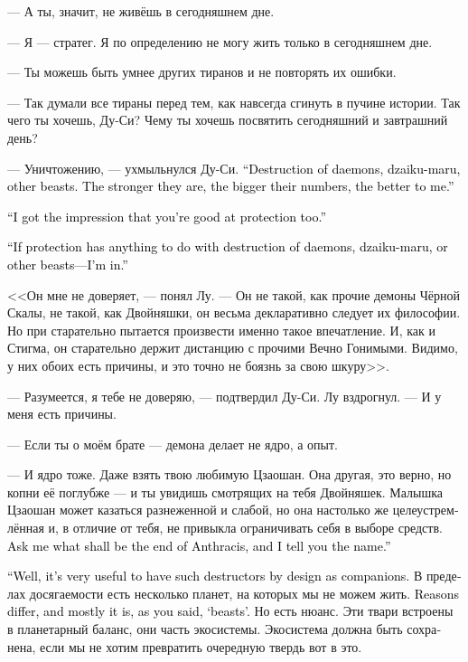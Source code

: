 \documentclass[a4paper,12pt,fleqn]{book}\usepackage{cooltooltips}\usepackage{polyglossia}\setdefaultlanguage[babelshorthands=true]{russian}\setotherlanguage{english}\defaultfontfeatures{Ligatures=TeX,Mapping=tex-text} \usepackage{xcolor}\definecolor{lightgray}{HTML}{bbbbbb}\color{lightgray}\newcommand{\ml}[3]{\textenglish{\textcolor{black}{#3}}}
\begin{document}
{--- А ты, значит, не живёшь в сегодняшнем дне.

--- Я --- стратег.
Я по определению не могу жить только в сегодняшнем дне.

--- Ты можешь быть умнее других тиранов и не повторять их ошибки.

--- Так думали все тираны перед тем, как навсегда сгинуть в пучине истории.
Так чего ты хочешь, Ду-Си?
Чему ты хочешь посвятить сегодняшний и завтрашний день?

--- Уничтожению, --- ухмыльнулся Ду-Си.
\ml{$0$}
{--- Уничтожать демонов, дзайку-мару, иных тварей.}
{``Destruction of daemons, dzaiku-maru, other beasts.}
\ml{$0$}
{Чем сильнее и многочисленнее твари --- тем лучше.}
{The stronger they are, the bigger their numbers, the better to me.''}

\ml{$0$}
{--- У меня создалось впечатление, что ты не против и защищать.}
{``I got the impression that you're good at protection too.''}

\ml{$0$}
{--- Если защита связана с уничтожением демонов, дзайку-мару и иных тварей --- я не против.}
{``If protection has anything to do with destruction of daemons, dzaiku-maru, or other beasts---I'm in.''}

<<Он мне не доверяет, --- понял Лу.
--- Он не такой, как прочие демоны Чёрной Скалы, не такой, как Двойняшки, он весьма декларативно следует их философии.
Но при старательно пытается произвести именно такое впечатление.
И, как и Стигма, он старательно держит дистанцию с прочими Вечно Гонимыми.
Видимо, у них обоих есть причины, и это точно не боязнь за свою шкуру>>.

--- Разумеется, я тебе не доверяю, --- подтвердил Ду-Си.
Лу вздрогнул.
--- И у меня есть причины.

--- Если ты о моём брате --- демона делает не ядро, а опыт.

--- И ядро тоже.
Даже взять твою любимую Цзаошан.
Она другая, это верно, но копни её поглубже --- и ты увидишь смотрящих на тебя Двойняшек.
Малышка Цзаошан может казаться разнеженной и слабой, но она настолько же целеустремлённая и, в отличие от тебя, не привыкла ограничивать себя в выборе средств.
\ml{$0$}
{Спроси, что положит конец клану Антрацис --- и я назову тебе имя.}
{Ask me what shall be the end of Anthracis, and I tell you the name.''}

\ml{$0$}
{--- Что ж, очень кстати, что у меня есть соратники, спроектированные для уничтожения.}
{``Well, it's very useful to have such destructors by design as companions.}
В пределах досягаемости есть несколько планет, на которых мы не можем жить.
\ml{$0$}
{Причины разные, чаще всего это, как ты выразился, <<твари>>.}
{Reasons differ, and mostly it is, as you said, `beasts'.}
Но есть нюанс.
Эти твари встроены в планетарный баланс, они часть экосистемы.
Экосистема должна быть сохранена, если мы не хотим превратить очередную твердь вот в это.

}
\end{document}
